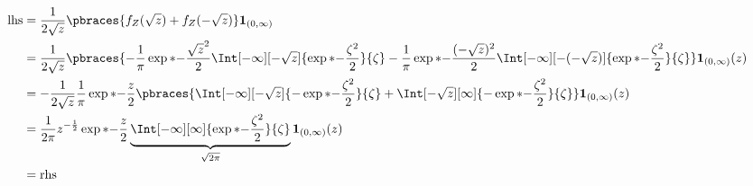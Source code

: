 \begin{solution}
\begin{align*}
    \text{lhs}
    & =
    \frac{1}{2 \sqrt z}
    \pbraces
    {
        f_Z(\sqrt z) + f_Z(-\sqrt z)
    }
    \mathbf 1_{(0, \infty)} \\
    & =
    \frac{1}{2 \sqrt z}
    \pbraces
    {
        -
        \frac{1}{\pi}
        \exp*{-\frac{\sqrt z^2}{2}}
        \Int[-\infty][-\sqrt z]
        {
            \exp*{-\frac{\zeta^2}{2}}
        }{\zeta}
        -
        \frac{1}{\pi}
        \exp*{-\frac{(-\sqrt z)^2}{2}}
        \Int[-\infty][-(-\sqrt z)]
        {
            \exp*{-\frac{\zeta^2}{2}}
        }{\zeta}
    }
    \mathbf 1_{(0, \infty)}(z) \\
    & =
    -\frac{1}{2 \sqrt z}
    \frac{1}{\pi}
    \exp*{-\frac{z}{2}}
    \pbraces
    {
        \Int[-\infty][-\sqrt z]
        {
            -\exp*{-\frac{\zeta^2}{2}}
        }{\zeta}
        +
        \Int[-\sqrt z][\infty]
        {
            -\exp*{-\frac{\zeta^2}{2}}
        }{\zeta}
    }
    \mathbf 1_{(0, \infty)}(z) \\
    & =
    \frac{1}{2 \pi}
    z^{-\frac{1}{2}}
    \exp*{-\frac{z}{2}}
    \underbrace
    {
        \Int[-\infty][\infty]
        {
            \exp*{-\frac{\zeta^2}{2}}
        }{\zeta}
    }_{
        \sqrt{2 \pi}
    }
    \mathbf 1_{(0, \infty)}(z) \\
    & =
    \text{rhs}
\end{align*}

\end{solution}

